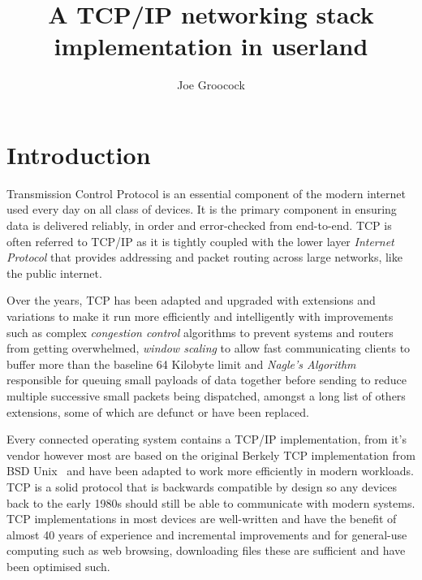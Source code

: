 \documentclass[11pt,a4paper,british]{bhamarticle}
\title{A TCP/IP networking stack implementation in userland}
\author{Joe Groocock}
\begin{document}

\maketitle

\begin{abstract}
\end{abstract}

\tableofcontents
\newpage


\section{Introduction}
Transmission Control Protocol is an essential component of the modern internet used every day on all class of devices. It is the primary component in ensuring data is delivered reliably, in order and error-checked from end-to-end. TCP is often referred to TCP/IP as it is tightly coupled with the lower layer \textit{Internet Protocol} that provides addressing and packet routing across large networks, like the public internet.

Over the years, TCP has been adapted and upgraded with extensions and variations to make it run more efficiently and intelligently with improvements such as complex \textit{congestion control} algorithms to prevent systems and routers from getting overwhelmed, \textit{window scaling} to allow fast communicating clients to buffer more than the baseline 64 Kilobyte limit and \textit{Nagle's Algorithm}~\cite{rfc896} responsible for queuing small payloads of data together before sending to reduce multiple successive small packets being dispatched, amongst a long list of others extensions, some of which are defunct or have been replaced.

Every connected operating system contains a TCP/IP implementation, from it's vendor however most are based on the original Berkely TCP implementation from BSD Unix~\cite{rfc793} and have been adapted to work more efficiently in modern workloads. TCP is a solid protocol that is backwards compatible by design so any devices back to the early 1980s should still be able to communicate with modern systems. TCP implementations in most devices are well-written and have the benefit of almost 40 years of experience and incremental improvements and for general-use computing such as web browsing, downloading files these are sufficient and have been optimised such.
\end{document}
